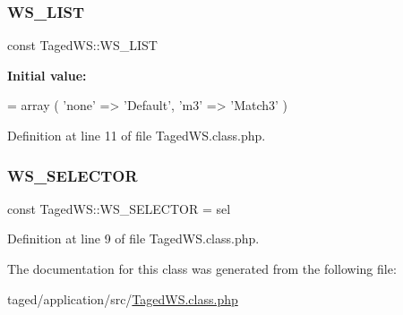 \subsubsection{\texorpdfstring{W\+S\+\_\+\+L\+I\+ST}{WS\_LIST}}
{\footnotesize\ttfamily const Taged\+W\+S\+::\+W\+S\+\_\+\+L\+I\+ST}

{\bfseries Initial value\+:}
\begin{DoxyCode}
= array (
        \textcolor{stringliteral}{'none'} => \textcolor{stringliteral}{'Default'},
        \textcolor{stringliteral}{'m3'} => \textcolor{stringliteral}{'Match3'}
    )
\end{DoxyCode}


Definition at line 11 of file Taged\+W\+S.\+class.\+php.

\mbox{\label{class_taged_w_s_a7d8cb9e784db33909bf14633a126455c}} 
\subsubsection{\texorpdfstring{W\+S\+\_\+\+S\+E\+L\+E\+C\+T\+OR}{WS\_SELECTOR}}
{\footnotesize\ttfamily const Taged\+W\+S\+::\+W\+S\+\_\+\+S\+E\+L\+E\+C\+T\+OR = \textquotesingle{}sel\textquotesingle{}}



Definition at line 9 of file Taged\+W\+S.\+class.\+php.



The documentation for this class was generated from the following file\+:\begin{DoxyCompactItemize}
\item 
taged/application/src/\hyperlink{_taged_w_s_8class_8php}{Taged\+W\+S.\+class.\+php}\end{DoxyCompactItemize}
